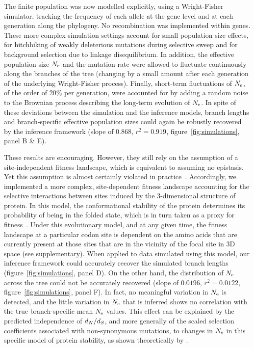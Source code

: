 \documentclass{article}
\begin{document}
    The finite population was now modelled explicitly, using a Wright-Fisher simulator, tracking the frequency of each {allele} at the gene level and at each generation along the phylogeny.
    No {recombination} was implemented within genes.
    These more complex simulation settings account for small population size effects, for hitchhiking of weakly deleterious mutations during selective sweep and for background selection due to linkage disequilibrium.
    In addition, the {effective population size} $N_{\text{e}}$ and the mutation rate were allowed to fluctuate continuously along the branches of the tree (changing by a small amount after each generation of the underlying Wright-Fisher process).
    Finally, short-term fluctuations of $N_{\text{e}}$, of the order of 20\% per generation, were accounted for by adding a random noise to the Brownian process describing the long-term evolution of $N_{\text{e}}$.
    In spite of these deviations between the simulation and the inference models, branch lengths and branch-specific {effective population sizes} could again be robustly recovered by the inference framework (slope of $0.868$, $r^2=0.919$, figure~\ref{fig:simulations}, panel B \& E).

    These results are encouraging.
    However, they still rely on the assumption of a site-independent fitness landscape, which is equivalent to assuming no epistasis.
    Yet this assumption is almost certainly violated in practice~\citep{Pollock2014,Shah2015}.
    Accordingly, we implemented a more complex, site-dependent fitness landscape accounting for the selective interactions between sites induced by the 3-dimensional structure of protein.
    In this model, the conformational stability of the protein determines its probability of being in the folded state, which is in turn taken as a proxy for fitness~\citep{Williams2006, Goldstein2011, Pollock2012}.
    Under this evolutionary model, and at any given time, the fitness landscape at a particular {codon} site is dependent on the amino acids that are currently present at those sites that are in the vicinity of the focal site in 3D space (see supplementary).
    When applied to data simulated using this model, our inference framework could accurately recover the simulated branch lengths (figure~\ref{fig:simulations}, panel D).
    On the other hand, the distribution of $N_{\text{e}}$ across the tree could not be accurately recovered (slope of $0.0196$, $r^2 = 0.0122$, figure~\ref{fig:simulations}, panel F).
    In fact, no meaningful variation in $N_{\text{e}}$ is detected, and the little variation in $N_{\text{e}}$ that is inferred shows no correlation with the true branch-specific mean $N_{\text{e}}$ values.
    This effect can be explained by the predicted independence of $d_N / d_S$, and more generally of the scaled selection coefficients associated with {non-synonymous} mutations, to changes in $N_{\text{e}}$ in this specific model of protein stability, as shown theoretically by \citet{Goldstein2013}.
\end{document}
